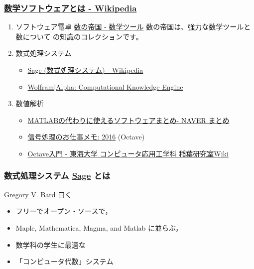 \documentclass[dvipdfmx,11pat]{jarticle}
\begin{document}
\subsubsection{\href{https://ja.wikipedia.org/wiki/\%E6\%95\%B0\%E5\%AD\%A6\%E3\%82\%BD\%E3\%83\%95\%E3\%83\%88\%E3\%82\%A6\%E3\%82\%A7\%E3\%82\%A2}{数学ソフトウェアとは - Wikipedia}}
\label{sec:orgeac7b53}
\begin{enumerate}
\item ソフトウェア電卓  
\href{http://ja.numberempire.com/}{数の帝国 - 数学ツール} 数の帝国は、強力な数学ツールと数について
の知識のコレクションです。
\item 数式処理システム
\begin{itemize}
\item \href{https://ja.wikipedia.org/wiki/Sage\_(\%E6\%95\%B0\%E5\%BC\%8F\%E5\%87\%A6\%E7\%90\%86\%E3\%82\%B7\%E3\%82\%B9\%E3\%83\%86\%E3\%83\%A0)}{Sage (数式処理システム) - Wikipedia}
\item \href{http://www.wolframalpha.com/}{Wolfram|Alpha: Computational Knowledge Engine}
\end{itemize}
\item 数値解析
\begin{itemize}
\item \href{https://matome.naver.jp/odai/2136163231573327601}{MATLABの代わりに使えるソフトウェアまとめ- NAVER まとめ}
\item \href{http://signalprocessor.blogspot.jp/2016/}{信号処理のお仕事メモ: 2016} (Octave)
\item \href{http://www.inaba-lab.org/wiki/index.php/Octave\%E5\%85\%A5\%E9\%96\%80}{Octave入門 - 東海大学 コンピュータ応用工学科 稲葉研究室Wiki}
\end{itemize}
\end{enumerate}
\subsubsection{数式処理システム \href{http://www.sagemath.org}{Sage} とは}
\label{sec:org72f64c1}
\href{http://www.gregorybard.com/Sage.html}{Gregory V. Bard} 曰く
\begin{itemize}
\item フリーでオープン・ソースで，
\item Maple, Mathematica, Magma, and Matlab に並らぶ，
\item 数学科の学生に最適な
\item 「コンピュータ代数」システム
\end{itemize}
\end{document}
